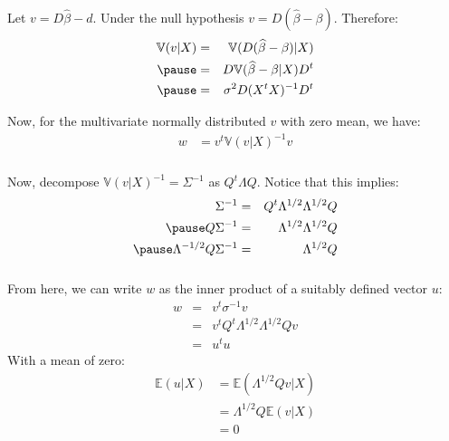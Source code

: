 \begin{frame}[fragile] \frametitle{}

Let $v = D\widehat{\beta} - d$. Under the null hypothesis $v = D (\widehat{\beta} - \beta)$.
\pause Therefore:
\begin{eqnarray*}
\mathbb{V} (v | X) &=& \mathbb{V} (D (\widehat{\beta} - \beta) | X) \\ \pause
&=& D \mathbb{V} (\widehat{\beta} - \beta | X) D^t \\ \pause
&=& \sigma^2 D (X^t X)^{-1} D^t
\end{eqnarray*}

\pause
Now, for the multivariate normally distributed $v$ with zero mean,
we have:
\begin{align*}
w &= v^t \mathbb{V} (v | X)^{-1} v
\end{align*}
\end{frame}

\begin{frame}[fragile] \frametitle{}

Now, decompose $ \mathbb{V} (v | X)^{-1} = \Sigma^{-1}$
as $Q^t \Lambda Q$. Notice that this implies:
\begin{eqnarray*}
\Sigma^{-1} &=& Q^t \Lambda^{1/2} \Lambda^{1/2} Q \\ \pause
Q \Sigma^{-1} &=& \Lambda^{1/2} \Lambda^{1/2} Q  \\ \pause
\Lambda^{-1/2} Q \Sigma^{-1} &=& \Lambda^{1/2} Q
\end{eqnarray*}

\end{frame}

\begin{frame}[fragile] \frametitle{}

From here, we can write $w$ as the inner product of
a suitably defined vector $u$:
\begin{eqnarray*}
w &=& v^t \sigma^{-1} v \\
&=& v^t Q^t \Lambda^{1/2} \Lambda^{1/2} Q v \\
&=& u^t u
\end{eqnarray*}
With a mean of zero:
\begin{align*}
\mathbb{E} (u | X) &= \mathbb{E} (\Lambda^{1/2} Q v | X) \\
&= \Lambda^{1/2} Q \mathbb{E} (v | X) \\
&= 0
\end{align*}

\end{frame}

